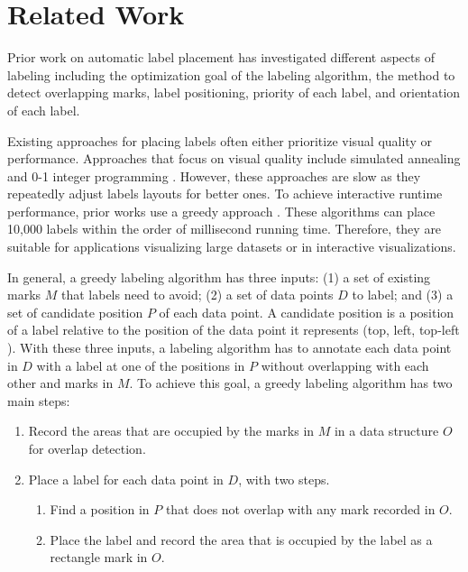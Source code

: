 \section{Related Work}

Prior work on automatic label placement has investigated different aspects of labeling including the optimization goal of the labeling algorithm, the method to detect overlapping marks, label positioning, priority of each label, and orientation of each label.

Existing approaches for placing labels often either prioritize visual quality or performance.
Approaches that focus on visual quality include simulated annealing \cite{zoraster:annealing} and 0-1 integer programming \cite{zoraster:int-program}.
However, these approaches are slow as they repeatedly adjust labels layouts for better ones.
To achieve interactive runtime performance, prior works use a greedy approach \cite{luboschik:particle, mote:informed-greedy}.
These algorithms can place 10,000 labels within the order of millisecond running time.
Therefore, they are suitable for applications visualizing large datasets or in interactive visualizations.

In general, a greedy labeling algorithm has three inputs: (1) a set of existing marks $M$ that labels need to avoid; (2) a set of data points $D$ to label; and (3) a set of candidate position $P$ of each data point.
A candidate position is a position of a label relative to the position of the data point it represents (top, left, top-left \etc).
With these three inputs, a labeling algorithm has to annotate each data point in $D$ with a label at one of the positions in $P$ without overlapping with each other and marks in $M$.
To achieve this goal, a greedy labeling algorithm has two main steps:
\begin{enumerate}
  \vspace{-5pt}
  \item Record the areas that are occupied by the marks in $M$ in a data structure $O$ for overlap detection.
  \vspace{-5pt}
  \item Place a label for each data point in $D$, with two steps.
  \vspace{-5pt}
  \begin{enumerate}
    \item Find a position in $P$ that does not overlap with any mark recorded in $O$.
    \vspace{-2.5pt}
    \item Place the label and record the area that is occupied by the label as a rectangle mark in $O$.
  \end{enumerate}
\end{enumerate}

